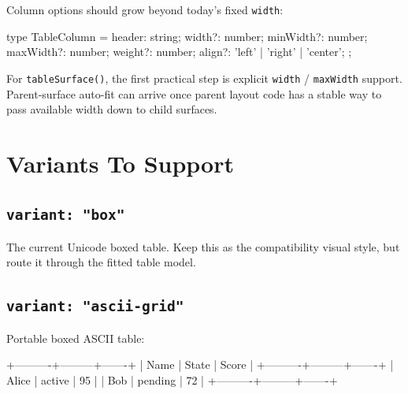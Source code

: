 Column options should grow beyond today's fixed \texttt{w\allowbreak{}i\allowbreak{}d\allowbreak{}t\allowbreak{}h}:

\begin{CodeBlock}
type TableColumn = {
  header: string;
  width?: number;
  minWidth?: number;
  maxWidth?: number;
  weight?: number;
  align?: 'left' | 'right' | 'center';
};
\end{CodeBlock}

For \texttt{t\allowbreak{}a\allowbreak{}b\allowbreak{}l\allowbreak{}e\allowbreak{}S\allowbreak{}u\allowbreak{}r\allowbreak{}f\allowbreak{}a\allowbreak{}c\allowbreak{}e\allowbreak{}(\allowbreak{})}, the first practical step is explicit \texttt{w\allowbreak{}i\allowbreak{}d\allowbreak{}t\allowbreak{}h} / \texttt{m\allowbreak{}a\allowbreak{}x\allowbreak{}W\allowbreak{}i\allowbreak{}d\allowbreak{}t\allowbreak{}h} support. Parent-surface auto-fit can arrive once parent layout code has a stable way to pass available width down to child surfaces.

\section{Variants To Support}\label{record-133-variants-to-support}

\subsection{\texorpdfstring{\texttt{v\allowbreak{}a\allowbreak{}r\allowbreak{}i\allowbreak{}a\allowbreak{}n\allowbreak{}t\allowbreak{}:\allowbreak{} \allowbreak{}"\allowbreak{}b\allowbreak{}o\allowbreak{}x\allowbreak{}"}}{}}\label{record-133-variant-box}

The current Unicode boxed table. Keep this as the compatibility visual style, but route it through the fitted table model.

\subsection{\texorpdfstring{\texttt{v\allowbreak{}a\allowbreak{}r\allowbreak{}i\allowbreak{}a\allowbreak{}n\allowbreak{}t\allowbreak{}:\allowbreak{} \allowbreak{}"\allowbreak{}a\allowbreak{}s\allowbreak{}c\allowbreak{}i\allowbreak{}i\allowbreak{}-\allowbreak{}g\allowbreak{}r\allowbreak{}i\allowbreak{}d\allowbreak{}"}}{}}\label{record-133-variant-ascii-grid}

Portable boxed ASCII table:

\begin{CodeBlock}
+----------+---------+-------+
| Name     | State   | Score |
+----------+---------+-------+
| Alice    | active  | 95    |
| Bob      | pending | 72    |
+----------+---------+-------+
\end{CodeBlock}

